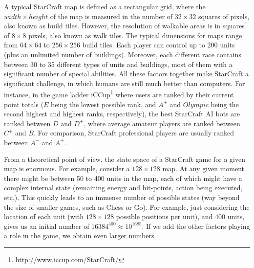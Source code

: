 \documentclass{llncs}
\begin{document}
A typical  StarCraft map is defined  as a rectangular grid,  where the
$width \times  height$ of  the map  is measured in  the number  of $32
\times 32$ squares of pixels, also  known as build tiles. However, the
resolution of  walkable areas is  in squares  of $8 \times  8$ pixels,
also known as  walk tiles. The typical dimensions for  maps range from
$64  \times 64$  to  $256 \times  256$ build  tiles.  Each player  can
control  up to  200 units  (plus  an unlimited  number of  buildings).
Moreover,  each different  race contains  between 30  to 35  different
types of units  and buildings, most of them with  a significant number
of  special abilities.  All these  factors together  make StarCraft  a
significant  challenge, in  which humans  are still  much better  than
computers.      For     instance,      in     the      game     ladder
iCCup\footnote{http://www.iccup.com/StarCraft/} where users are ranked
by their current point totals ($E$ being the lowest possible rank, and
$A^+$  and  $Olympic$ being  the  second  highest and  highest  ranks,
respectively), the best  StarCraft AI bots are ranked  between $D$ and
$D^+$,  where average  amateur players  are ranked  between $C^+$  and
$B$. For comparison, StarCraft professional players are usually ranked
between $A^-$ and $A^+$.

From a theoretical point of view,  the state space of a StarCraft game
for a given map is enormous.  For example, consider a $128 \times 128$
map. At any given moment there might be between 50 to 400 units in the
map,  each of  which might  have a  complex internal  state (remaining
energy  and hit-points,  action  being executed,  etc.). This  quickly
leads to an immense number of  possible states (way beyond the size of
smaller games, such as Chess or Go). For example, just considering the
location of  each unit (with  $128 \times 128$ possible  positions per
unit),  and 400  units, gives  us  an initial  number of  $16384^{400}
\approx 10^{1685}$. If we add the  other factors playing a role in the
game, we obtain even larger numbers.
\end{document}
